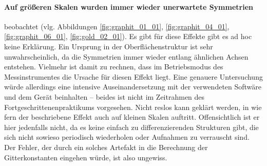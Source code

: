 \paragraph{Auf größeren Skalen wurden immer wieder unerwartete Symmetrien} beobachtet (vlg. Abbildungen 
\ref{fig:graphit_01_01}, \ref{fig:graphit_04_01}, \ref{fig:graphit_06_01}, \ref{fig:gold_02_01}). 
Es gibt für diese Effekte gibt es ad hoc keine Erklärung. Ein Ursprung in der Oberflächenstruktur ist 
sehr unwahrscheinlich, da die Symmetrien immer wieder entlang ähnlichen Achsen entstehen. Vielmehr ist 
damit zu rechnen, dass im Betriebsmodus des Messinstrumentes die Ursache für diesen Effekt liegt. Eine 
genauere Untersuchung würde allerdings eine intensive Auseinandersetzung mit der verwendeten Softwäre 
und dem Gerät beinhalten – beides ist nicht im Zeitrahmen des Fortgeschrittenenpraktikums vorgesehen. 
Nicht reslos kann geklärt werden, in wie fern der beschriebene Effekt auch auf kleinen Skalen auftritt. 
Offensichtlich ist er hier jedenfalls nicht, da es keine einfach zu differenzierenden Strukturen gibt, die 
sich nicht sowieso periodisch wiederholen oder Aufnahmen zu verrauscht sind. 
Der Fehler, der durch ein solches Artefakt in die Berechnung der 
Gitterkonstanten eingehen würde, ist also ungewiss. 

